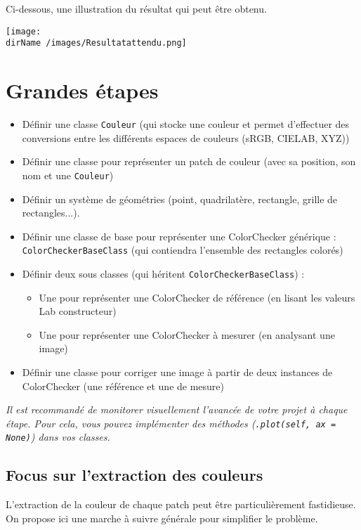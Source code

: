 Ci-dessous, une illustration du résultat qui peut être obtenu. 

\begin{center}
	\texttt{[image:  \\dirName /images/Resultatattendu.png]}
\end{center}

\section{Grandes étapes}

\begin{itemize}
	\item Définir une classe \texttt{Couleur} (qui stocke une couleur et permet d'effectuer des conversions entre les différents espaces de couleurs (sRGB, CIELAB, XYZ))
	\item Définir une classe pour représenter un patch de couleur (avec sa position, son nom et une \texttt{Couleur})
	\item Définir un système de géométries (point, quadrilatère, rectangle, grille de rectangles...). 
	\item Définir une classe de base pour représenter une ColorChecker générique :  \texttt{ColorCheckerBaseClass} (qui contiendra l'ensemble des rectangles colorés)
	\item Définir deux sous classes (qui héritent \texttt{ColorCheckerBaseClass}) : 
	\begin{itemize}
		\item Une pour représenter une ColorChecker de référence (en lisant les valeurs Lab constructeur)
		\item Une pour représenter une ColorChecker à mesurer (en analysant une image)
	\end{itemize}
	\item Définir une classe pour corriger une image à partir de deux instances de ColorChecker (une référence et une de mesure)
\end{itemize}

\medskip

\textit{Il est recommandé de monitorer visuellement l'avancée de votre projet à chaque étape. Pour cela, vous pouvez implémenter des méthodes (\texttt{.plot(self, ax = None)}) dans vos classes.}

\subsection{Focus sur l'extraction des couleurs}
L'extraction de la couleur de chaque patch peut être particulièrement  fastidieuse. On propose ici une marche à suivre générale pour simplifier le problème. 

